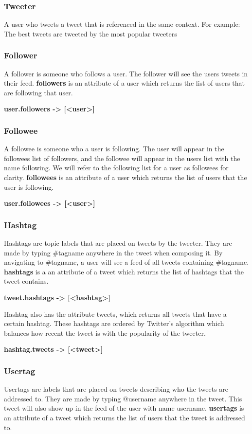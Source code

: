 \subsubsection{Tweeter}
A user who tweets a tweet that is referenced in the same context. For example: The best tweets are tweeted by the most popular tweeters


\subsubsection{Follower}
A follower is someone who follows a user. The follower will see the users tweets in their feed. \textbf{followers} is an attribute of a user which returns the list of users that are following that user.

  \textbf{user.followers -> [<user>]}

\subsubsection{Followee}
A followee is someone who a user is following. The user will appear in the followees list of followers, and the followee will appear in the users list with the name following. We will refer to the following list for a user as followees for clarity. \textbf{followees} is an attribute of a user which returns the list of users that the user is following.

  \textbf{user.followees -> [<user>]}

\subsubsection{Hashtag}
Hashtags are topic labels that are placed on tweets by the tweeter. They are made by typing \#tagname anywhere in the tweet when composing it. By navigating to \#tagname, a user will see a feed of all tweets containing \#tagname. \textbf{hashtags} is a an attribute of a tweet which returns the list of hashtags that the tweet contains.

  \textbf{tweet.hashtags -> [<hashtag>]}

\noindent
Hashtag also has the attribute tweets, which returns all tweets that have a certain hashtag. These hashtags are ordered by Twitter's algorithm which balances how recent the tweet is with the popularity of the tweeter.

  \textbf{hashtag.tweets -> [<tweet>]}

\subsubsection{Usertag}
Usertags are labels that are placed on tweets describing who the tweets are addressed to. They are made by typing @username anywhere in the tweet. This tweet will also show up in the feed of the user with name username. \textbf{usertags} is an attribute of a tweet which returns the list of users that the tweet is addressed to.

